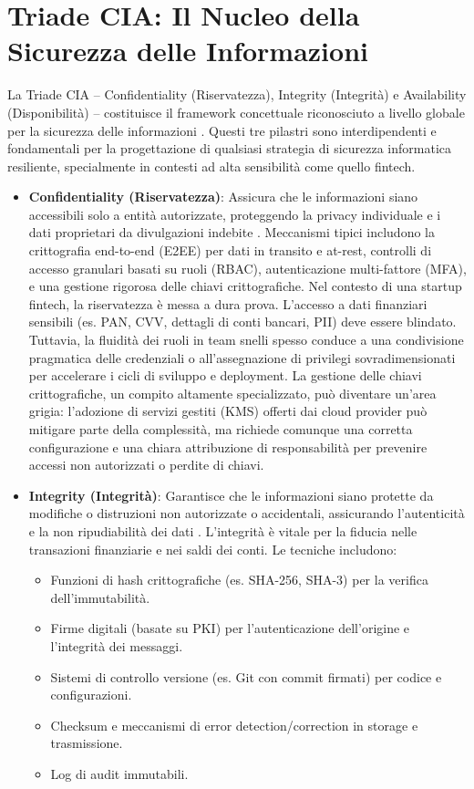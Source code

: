 \section{Triade CIA: Il Nucleo della Sicurezza delle Informazioni}
La Triade CIA – Confidentiality (Riservatezza), Integrity (Integrità) e Availability (Disponibilità) – costituisce il framework concettuale riconosciuto a livello globale per la sicurezza delle informazioni \cite{NIST_SP_1800_26}. Questi tre pilastri sono interdipendenti e fondamentali per la progettazione di qualsiasi strategia di sicurezza informatica resiliente, specialmente in contesti ad alta sensibilità come quello fintech.
\begin{itemize}
\item \textbf{Confidentiality (Riservatezza)}: Assicura che le informazioni siano accessibili solo a entità autorizzate, proteggendo la privacy individuale e i dati proprietari da divulgazioni indebite \cite{NIST_SP_1800_26}. Meccanismi tipici includono la crittografia end-to-end (E2EE) per dati in transito e at-rest, controlli di accesso granulari basati su ruoli (RBAC), autenticazione multi-fattore (MFA), e una gestione rigorosa delle chiavi crittografiche.
Nel contesto di una startup fintech, la riservatezza è messa a dura prova. L'accesso a dati finanziari sensibili (es. PAN, CVV, dettagli di conti bancari, PII) deve essere blindato. Tuttavia, la fluidità dei ruoli in team snelli spesso conduce a una condivisione pragmatica delle credenziali o all'assegnazione di privilegi sovradimensionati per accelerare i cicli di sviluppo e deployment. La gestione delle chiavi crittografiche, un compito altamente specializzato, può diventare un'area grigia: l'adozione di servizi gestiti (KMS) offerti dai cloud provider può mitigare parte della complessità, ma richiede comunque una corretta configurazione e una chiara attribuzione di responsabilità per prevenire accessi non autorizzati o perdite di chiavi.

\item \textbf{Integrity (Integrità)}: Garantisce che le informazioni siano protette da modifiche o distruzioni non autorizzate o accidentali, assicurando l'autenticità e la non ripudiabilità dei dati \cite{NIST_SP_1800_26}. L'integrità è vitale per la fiducia nelle transazioni finanziarie e nei saldi dei conti. Le tecniche includono:
\begin{itemize}
    \item Funzioni di hash crittografiche (es. SHA-256, SHA-3) per la verifica dell'immutabilità.
    \item Firme digitali (basate su PKI) per l'autenticazione dell'origine e l'integrità dei messaggi.
    \item Sistemi di controllo versione (es. Git con commit firmati) per codice e configurazioni.
    \item Checksum e meccanismi di error detection/correction in storage e trasmissione.
    \item Log di audit immutabili.
\end{itemize}


\end{itemize}
